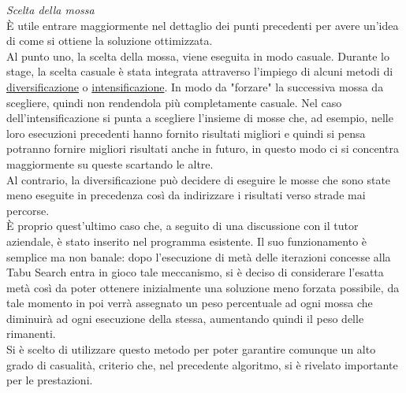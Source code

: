 \textit{Scelta della mossa}\\
È utile entrare maggiormente nel dettaglio dei punti precedenti per avere un'idea di come si ottiene la soluzione ottimizzata.\\
Al punto uno, la scelta della mossa, viene eseguita in modo casuale. Durante lo stage, la scelta casuale è stata integrata attraverso l'impiego di alcuni metodi di \hyperref[Diversificazione]{diversificazione\glo} o \hyperref[Intensificazione]{intensificazione\glo}. 
In modo da "forzare" la successiva mossa da scegliere,
quindi non rendendola più completamente casuale. Nel caso dell'intensificazione si punta a scegliere l'insieme di mosse che, ad esempio, nelle loro esecuzioni precedenti hanno fornito
risultati migliori e quindi si pensa potranno fornire migliori risultati anche in futuro, in questo modo ci si concentra maggiormente su queste scartando le altre.\\
Al contrario, la diversificazione può decidere di eseguire le mosse che sono state meno eseguite in precedenza così da indirizzare i risultati verso strade mai 
percorse.\\ È proprio quest'ultimo caso che, a seguito di una discussione con il tutor aziendale, è stato inserito nel programma esistente. Il suo funzionamento è semplice ma non banale:
dopo l'esecuzione di metà delle iterazioni concesse alla Tabu Search entra in gioco tale meccanismo, si è deciso di considerare l'esatta metà così da poter ottenere inizialmente una
soluzione meno forzata possibile, da tale momento in poi verrà assegnato un peso percentuale ad ogni mossa che diminuirà ad ogni esecuzione della stessa, aumentando quindi il 
peso delle rimanenti.\\ 
Si è scelto di utilizzare questo metodo per poter garantire comunque un alto grado di casualità, criterio che, nel precedente algoritmo, si è rivelato importante per le prestazioni.\\

